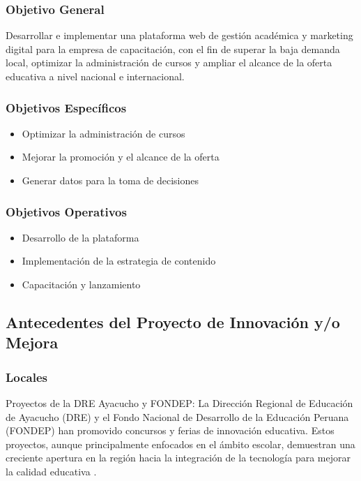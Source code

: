 \subsubsection{Objetivo General}
Desarrollar e implementar una plataforma web de gestión académica y marketing digital para la empresa de capacitación, con el fin de superar la baja demanda local, optimizar la administración de cursos y ampliar el alcance de la oferta educativa a nivel nacional e internacional.
\subsubsection{Objetivos Específicos}
\begin{itemize}
	\item {Optimizar la administración de cursos}
	\item {Mejorar la promoción y el alcance de la oferta}
	\item {Generar datos para la toma de decisiones}
\end{itemize}

\subsubsection{Objetivos Operativos}
\begin{itemize}
	\item {Desarrollo de la plataforma}
	\item {Implementación de la estrategia de contenido}
	\item {Capacitación y lanzamiento}
\end{itemize}


\subsection{Antecedentes del Proyecto de Innovación y/o Mejora}

\subsubsection{Locales}
Proyectos de la DRE Ayacucho y FONDEP: La Dirección Regional de Educación de Ayacucho (DRE) y el Fondo Nacional de Desarrollo de la Educación Peruana (FONDEP) han promovido concursos y ferias de innovación educativa. Estos proyectos, aunque principalmente enfocados en el ámbito escolar, demuestran una creciente apertura en la región hacia la integración de la tecnología para mejorar la calidad educativa \citep{minedu2021}.

